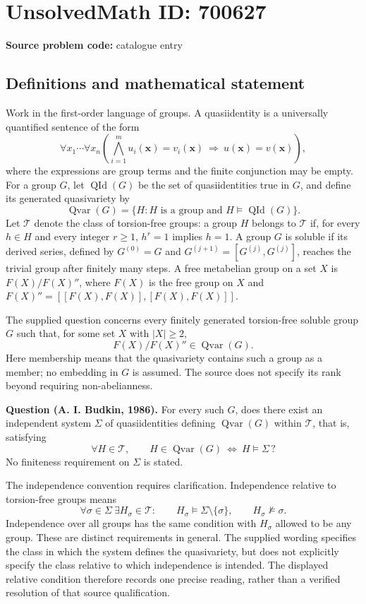\documentclass[11pt]{article}
\begin{document}
\section*{UnsolvedMath ID: 700627}
\textbf{Source problem code:} catalogue entry
\subsection{Definitions and mathematical statement}
Work in the first-order language of groups. A quasiidentity is a universally quantified sentence of the form
\[
\forall x_1\cdots\forall x_n\left(\bigwedge_{i=1}^{m}u_i(\mathbf{x})=v_i(\mathbf{x})\ \Longrightarrow\ u(\mathbf{x})=v(\mathbf{x})\right),
\]
where the expressions are group terms and the finite conjunction may be empty. For a group \(G\), let \(\operatorname{QId}(G)\) be the set of quasiidentities true in \(G\), and define its generated quasivariety by
\[
\operatorname{Qvar}(G)=\{H:H\text{ is a group and }H\models\operatorname{QId}(G)\}.
\]
Let \(\mathcal T\) denote the class of torsion-free groups: a group \(H\) belongs to \(\mathcal T\) if, for every \(h\in H\) and every integer \(r\geq1\), \(h^r=1\) implies \(h=1\). A group \(G\) is soluble if its derived series, defined by \(G^{(0)}=G\) and \(G^{(j+1)}=[G^{(j)},G^{(j)}]\), reaches the trivial group after finitely many steps. A free metabelian group on a set \(X\) is \(F(X)/F(X)''\), where \(F(X)\) is the free group on \(X\) and \(F(X)''=[[F(X),F(X)],[F(X),F(X)]]\).

The supplied question concerns every finitely generated torsion-free soluble group \(G\) such that, for some set \(X\) with \(|X|\geq2\),
\[
F(X)/F(X)''\in\operatorname{Qvar}(G).
\]
Here membership means that the quasivariety contains such a group as a member; no embedding in \(G\) is assumed. The source does not specify its rank beyond requiring non-abelianness.

\textbf{Question (A. I. Budkin, 1986).} For every such \(G\), does there exist an independent system \(\Sigma\) of quasiidentities defining \(\operatorname{Qvar}(G)\) within \(\mathcal T\), that is, satisfying
\[
\forall H\in\mathcal T,\qquad H\in\operatorname{Qvar}(G)\ \Longleftrightarrow\ H\models\Sigma\,?
\]
No finiteness requirement on \(\Sigma\) is stated.

The independence convention requires clarification. Independence relative to torsion-free groups means
\[
\forall\sigma\in\Sigma\ \exists H_\sigma\in\mathcal T:\qquad
H_\sigma\models\Sigma\setminus\{\sigma\},\qquad H_\sigma\not\models\sigma.
\]
Independence over all groups has the same condition with \(H_\sigma\) allowed to be any group. These are distinct requirements in general. The supplied wording specifies the class in which the system defines the quasivariety, but does not explicitly specify the class relative to which independence is intended. The displayed relative condition therefore records one precise reading, rather than a verified resolution of that source qualification.
\end{document}
